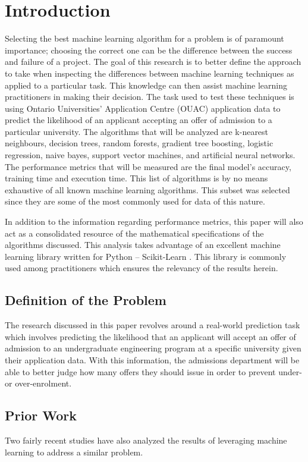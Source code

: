\chapter{Introduction}
Selecting the best machine learning algorithm for a problem is of paramount importance; choosing the correct one can be the difference between the success and failure of a project. The goal of this research is to better define the approach to take when inspecting the differences between machine learning techniques as applied to a particular task. This knowledge can then assist machine learning practitioners in making their decision. The task used to test these techniques is using Ontario Universities' Application Centre (OUAC) application data to predict the likelihood of an applicant accepting an offer of admission to a particular university. The algorithms that will be analyzed are k-nearest neighbours, decision trees, random forests, gradient tree boosting, logistic regression, naive bayes, support vector machines, and artificial neural networks. The performance metrics that will be measured are the final model's accuracy, training time and execution time. This list of algorithms is by no means exhaustive of all known machine learning algorithms. This subset was selected since they are some of the most commonly used for data of this nature.

In addition to the information regarding performance metrics, this paper will also act as a consolidated resource of the mathematical specifications of the algorithms discussed. This analysis takes advantage of an excellent machine learning library written for Python -- Scikit-Learn \cite{scikit-learn}. This library is commonly used among practitioners which ensures the relevancy of the results herein.



\section{Definition of the Problem}
The research discussed in this paper revolves around a real-world prediction task which involves predicting the likelihood that an applicant will accept an offer of admission to an undergraduate engineering program at a specific university given their application data. With this information, the admissions department will be able to better judge how many offers they should issue in order to prevent under- or over-enrolment.



\section{Prior Work}
Two fairly recent studies have also analyzed the results of leveraging machine learning to address a similar problem.

